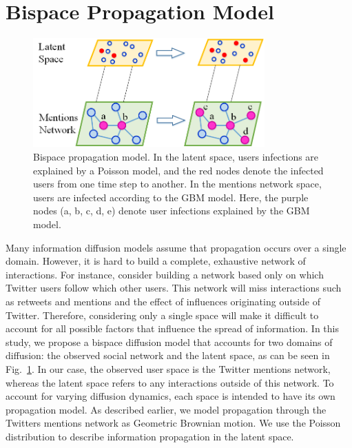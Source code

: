 \section{Bispace Propagation Model}

\begin{figure}[ht]
\centering
\includegraphics[width=3.5in] {figures/Bio-space.png}
\caption{Bispace propagation model. In the latent space, users infections are explained by a Poisson model, and the red nodes denote the infected users from one time step to another. In the mentions network space, users are infected according to the GBM model. Here, the purple nodes (a, b, c, d, e) denote user infections explained by the GBM model. }
\label{fig:bi-space}
\end{figure}


Many information diffusion models assume that propagation occurs over a single domain.
However, it is hard to build a complete, exhaustive network of interactions.
For instance, consider building a network based only on which Twitter users follow which other users. This network will miss interactions such as retweets and mentions and the effect of influences originating
outside of Twitter. Therefore, considering only a single space will make it difficult to account for all possible factors that influence the spread of information.
In this study, we propose a bispace diffusion model that accounts for two domains of diffusion: the observed social network and the latent space, as can be seen in Fig.~\ref{fig:bi-space}.
In our case, the observed user space is the Twitter mentions network,
whereas the latent space refers to any interactions outside of this network.
To account for varying diffusion dynamics, each space is intended to have
its own propagation model.
As described earlier, we model propagation through the Twitters mentions network as Geometric Brownian motion. We use the Poisson distribution to describe information propagation in the latent space.

